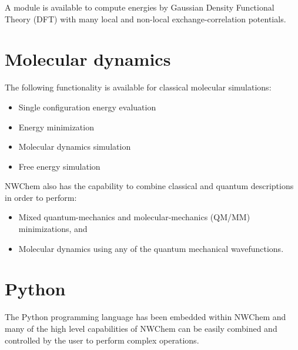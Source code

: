 A module is available to compute energies by Gaussian Density
Functional Theory (DFT) with many local and non-local
exchange-correlation potentials.

\section{Molecular dynamics}

The following functionality is available for classical molecular
simulations:
\begin{itemize}
\item Single configuration energy evaluation
\item Energy minimization
\item Molecular dynamics simulation
\item Free energy simulation 
\end{itemize}

NWChem also has the capability to combine classical and quantum
descriptions in order to perform:
\begin{itemize}
\item Mixed quantum-mechanics and molecular-mechanics (QM/MM)
  minimizations, and
\item Molecular dynamics using any of the quantum
  mechanical wavefunctions.
\end{itemize}

\section{Python}

The Python programming language has been embedded within NWChem and
many of the high level capabilities of NWChem can be easily combined
and controlled by the user to perform complex operations.
